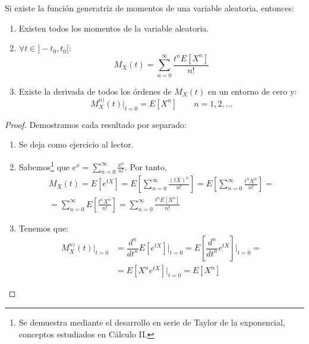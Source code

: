 \begin{teo} 
    Si existe la función generatriz de momentos de una variable aleatoria, entonces:
    \begin{enumerate}
        \item Existen todos los momentos de la variable aleatoria.

        \item $\forall t \in ]-t_0, t_0[$:
        $$M_X(t) = \sum_{n=0}^\infty \dfrac{t^nE[X^n]}{n!}$$

        \item Existe la derivada de todos los órdenes de $M_X(t)$ en un entorno de cero y:
        $$M_X^{n)}(t)\Big|_{t=0} = E[X^n] \qquad n = 1, 2, \ldots$$
    \end{enumerate}
\end{teo}
\begin{proof}
    Demostramos cada resultado por separado:
    \begin{enumerate}
        \item Se deja como ejercicio al lector.
        \item Sabemos\footnote{Se demuestra mediante el desarrollo en serie de Taylor de la exponencial, conceptos estudiados en Cálculo II.} que $e^x = \sum\limits_{n=0}^\infty \frac{x^n}{n!}$. Por tanto,
        \begin{multline*}
            M_X(t)=E[e^{tX}]
            = E\left[\sum_{n=0}^\infty \frac{(tX)^n}{n!}\right]
            = E\left[\sum_{n=0}^\infty \frac{t^n X^n}{n!}\right]
            =\\= \sum_{n=0}^\infty E\left[ \frac{t^n X^n}{n!}\right]
            = \sum_{n=0}^\infty \frac{t^n E\left[X^n\right]}{n!}
        \end{multline*}

        \item Tenemos que:
        \begin{align*}
            M_X^{n)}(t)\Big|_{t=0} &= \dfrac{d^n}{dt^n}E[e^{tX}]\Big|_{t=0} = E\left[\dfrac{d^n}{dt^n}e^{tX}\right]\Big|_{t=0} =\\
            &= E\left[X^n e^{tX}\right]\Big|_{t=0} = E[X^n]
        \end{align*}
    \end{enumerate}
\end{proof}

